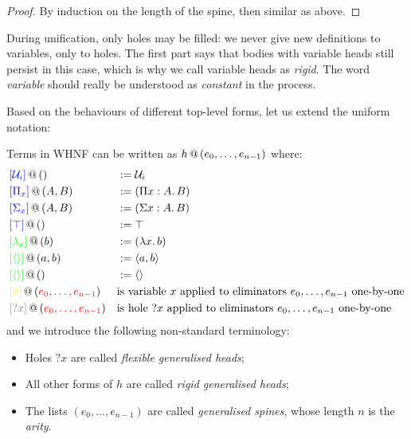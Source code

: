 \documentclass[twoside]{report}
\begin{document}
\begin{proof}
By induction on the length of the spine, then similar as above.
\end{proof}

During unification, only holes may be filled: we never give new definitions to variables, only to holes. The first part says that bodies with variable heads still persist in this case, which is why we call variable heads as \emph{rigid}. The word \emph{variable} should really be understood as \emph{constant} in the process.

Based on the behaviours of different top-level forms, let us extend the uniform notation:

\begin{definition}
\label{def:uniform_notation} Terms in WHNF can be written as ${h}\,@\,({e_0, \ldots, e_{n-1}})$ where:
$$
\begin{aligned}
&\form {\textcolor{blue}{[\mathcal U_i]}} {} &&\defeq \mathcal U_i \\
&\form {\textcolor{blue}{[\Pi_x]}} {A, B} &&\defeq (\ppi x A B) \\
&\form {\textcolor{blue}{[\Sigma_x]}} {A, B} &&\defeq (\sig x A B) \\
&\form {\textcolor{blue}{[\unit]}} {} &&\defeq \unit \\
&\form {\textcolor{green}{[\lambda_x]}} {b} &&\defeq (\lam x b) \\
&\form {\textcolor{green}{[\sstar]}} {a, b} &&\defeq \pair a b \\
&\form {\textcolor{green}{[\sstar]}} {} &&\defeq \sstar \\
&\form {\textcolor{yellow}{[x]}} {\textcolor{red}{e_0, \ldots, e_{n-1}}} &&\text{is variable $x$ applied to eliminators $e_0, \ldots, e_{n-1}$ one-by-one} \\
&\form {\textcolor{gray}{[?x]}} {\textcolor{red}{e_0, \ldots, e_{n-1}}} &&\text{is hole ${?x}$ applied to eliminators $e_0, \ldots, e_{n-1}$ one-by-one} \\
\end{aligned}
$$
and we introduce the following non-standard terminology:
\begin{itemize}[noitemsep]
    \item Holes ${?x}$ are called \emph{flexible generalised heads};
    \item All other forms of $h$ are called \emph{rigid generalised heads};
    \item The lists $(e_0, \ldots, e_{n-1})$ are called \emph{generalised spines}, whose length $n$ is the \emph{arity}.
\end{itemize}
\end{definition}
\end{document}

